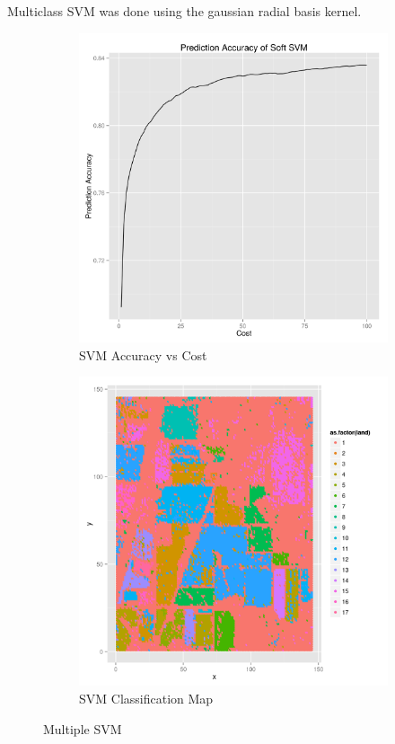 \documentclass[10pt,letterpaper]{article}
\begin{document}
Multiclass SVM was done using the gaussian radial basis kernel.
\begin{figure}[!hb]
\begin{center}
\begin{subfigure}[b]{0.3\textwidth}
\includegraphics[width=\textwidth]{SVM_accuracy.png}
\caption{SVM Accuracy vs Cost}
\end{subfigure}
\begin{subfigure}[b]{0.3\textwidth}
\includegraphics[width=\textwidth]{SVM_Landtypes.png}
\caption{SVM Classification Map}
\end{subfigure}
\caption{Multiple SVM}
\end{center}
\end{figure}
\end{document}
